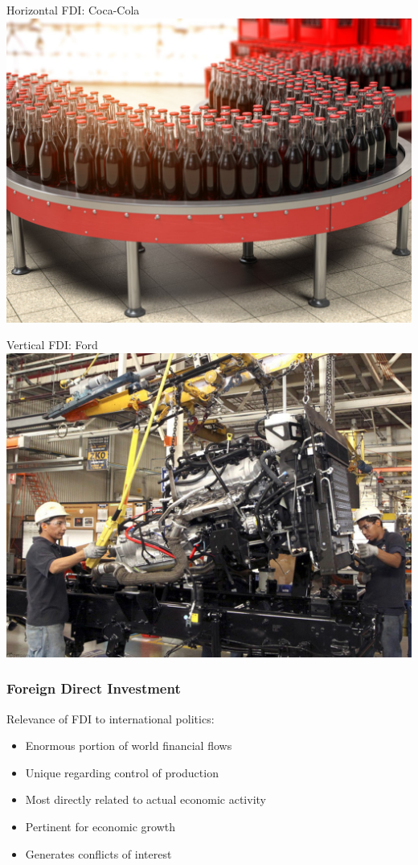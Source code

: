 \documentclass{beamer}
\begin{document}
\begin{frame}{\LARGE Horizontal FDI: Coca-Cola}
	\centering
	\includegraphics[width=\textwidth,height=0.8\textheight,keepaspectratio]{Coca Cola.jpg}
\end{frame}

\begin{frame}{\LARGE Vertical FDI: Ford}
	\centering
	\includegraphics[width=\textwidth,height=0.8\textheight,keepaspectratio]{Ford in Mexico.jpg}
\end{frame}

\begin{frame} 
	\frametitle{\LARGE{Foreign Direct Investment}}
	Relevance of FDI to international politics: \pause 
	\begin{itemize}
		\item Enormous portion of world financial flows \pause 
		\item Unique regarding control of production \pause 
		\item Most directly related to actual economic activity \pause 
		\item Pertinent for economic growth \pause 
		\item Generates conflicts of interest
	\end{itemize}		
	
\end{frame}
\end{document}
